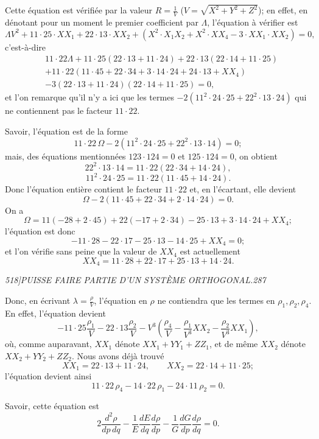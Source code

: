 \documentclass[11pt]{article}
\newcommand{\phead}[3]{\noindent\textit{#1\hfill #2\hfill #3}\par\medskip}
\begin{document}
Cette \'equation est v\'erifi\'ee par la valeur $R=\frac{1}{V}$
($V=\sqrt{X^2+Y^2+Z^2}$); en effet, en d\'enotant pour un moment le premier
coefficient par $\Lambda$, l'\'equation \`a v\'erifier est
\[
\Lambda V^2+11\cdot25\cdot XX_1+22\cdot13\cdot XX_2+
(X^2\cdot X_1X_2+X^2\cdot XX_4-3\cdot XX_1\cdot XX_2)=0,
\]
c'est-\`a-dire
\[
\begin{split}
&11\cdot22\Lambda+11\cdot25(22\cdot13+11\cdot24)
+22\cdot13(22\cdot14+11\cdot25)\\
&+11\cdot22(11\cdot45+22\cdot34+3\cdot14\cdot24+24\cdot13+XX_4)\\
&-3(22\cdot13+11\cdot24)(22\cdot14+11\cdot25)=0,
\end{split}
\]
et l'on remarque qu'il n'y a ici que les termes
$-2(11^2\cdot24\cdot25+22^2\cdot13\cdot24)$ qui ne contiennent pas le facteur
$11\cdot22$.

Savoir, l'\'equation est de la forme
\[
11\cdot22\,\Omega-2(11^2\cdot24\cdot25+22^2\cdot13\cdot14)=0;
\]
mais, des \'equations mentionn\'ees $123\cdot124=0$ et $125\cdot124=0$, on obtient
\[
22^2\cdot13\cdot14=11\cdot22(22\cdot34+14\cdot24),
\]
\[
11^2\cdot24\cdot25=11\cdot22(11\cdot45+14\cdot24).
\]
Donc l'\'equation enti\`ere contient le facteur $11\cdot22$ et, en l'\'ecartant, elle devient
\[
\Omega-2(11\cdot45+22\cdot34+2\cdot14\cdot24)=0.
\]
On a
\[
\Omega=11(-28+2\cdot45)+22(-17+2\cdot34)-25\cdot13+3\cdot14\cdot24+XX_4;
\]
l'\'equation est donc
\[
-11\cdot28-22\cdot17-25\cdot13-14\cdot25+XX_4=0;
\]
et l'on v\'erifie sans peine que la valeur de $XX_4$ est actuellement
\[
XX_4=11\cdot28+22\cdot17+25\cdot13+14\cdot24.
\]

\clearpage

\phead{518]}{PUISSE FAIRE PARTIE D'UN SYST\`EME ORTHOGONAL.}{287}

Donc, en \'ecrivant $\lambda=\frac{\rho}{V}$, l'\'equation en $\rho$ ne contiendra
que les termes en $\rho_1,\rho_2,\rho_4$. En effet, l'\'equation devient
\[
-11\cdot25\frac{\rho_1}{V}-22\cdot13\frac{\rho_2}{V}
-V^3\left(\frac{\rho_4}{V}-\frac{\rho_1}{V^3}XX_2-\frac{\rho_2}{V^3}XX_1\right),
\]
o\`u, comme auparavant, $XX_1$ d\'enote $XX_1+YY_1+ZZ_1$, et de m\^eme
$XX_2$ d\'enote $XX_2+YY_2+ZZ_2$. Nous avons d\'ej\`a trouv\'e
\[
XX_1=22\cdot13+11\cdot24,\qquad XX_2=22\cdot14+11\cdot25;
\]
l'\'equation devient ainsi
\[
11\cdot22\,\rho_4-14\cdot22\,\rho_1-24\cdot11\,\rho_2=0.
\]

Savoir, cette \'equation est
\[
2\frac{d^2\rho}{dp\,dq}-\frac{1}{E}\frac{dE}{dq}\frac{d\rho}{dp}
-\frac{1}{G}\frac{dG}{dp}\frac{d\rho}{dq}=0.
\]
\end{document}
